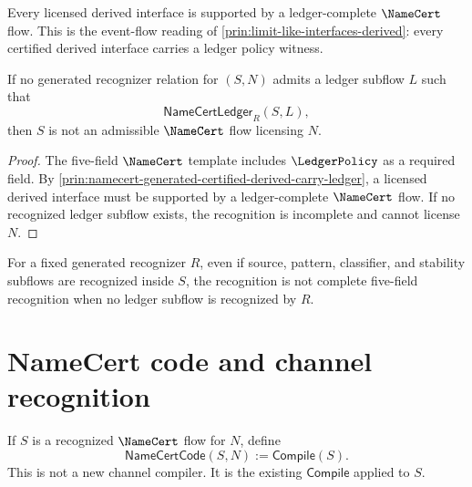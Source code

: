\begin{principle}
\label{prin:namecert-generated-certified-derived-carry-ledger}
Every licensed derived interface is supported by a ledger-complete $\NameCert$ flow. This is the event-flow reading of \autoref{prin:limit-like-interfaces-derived}: every certified derived interface carries a ledger policy witness.
\end{principle}

\begin{theorem}
\label{thm:namecert-generated-without-ledger-not-admissible}
If no generated recognizer relation for $(S,N)$ admits a ledger subflow $L$ such that
$$
  \mathsf{NameCertLedger}_{R}(S,L),
$$
then $S$ is not an admissible $\NameCert$ flow licensing $N$.
\end{theorem}

\begin{proof}
The five-field $\NameCert$ template includes $\LedgerPolicy$ as a required field. By \autoref{prin:namecert-generated-certified-derived-carry-ledger}, a licensed derived interface must be supported by a ledger-complete $\NameCert$ flow. If no recognized ledger subflow exists, the recognition is incomplete and cannot license $N$.
\end{proof}

\begin{corollary}
\label{cor:namecert-generated-four-fields-without-ledger-not-enough}
For a fixed generated recognizer $R$, even if source, pattern, classifier, and stability subflows are recognized inside $S$, the recognition is not complete five-field recognition when no ledger subflow is recognized by $R$.
\end{corollary}

\section{NameCert code and channel recognition}
\label{sec:namecert-generated-code-and-channel}

\begin{definition}
\label{def:namecert-generated-code}
If $S$ is a recognized $\NameCert$ flow for $N$, define
$$
  \mathsf{NameCertCode}(S,N) := \mathsf{Compile}(S).
$$
This is not a new channel compiler. It is the existing $\mathsf{Compile}$ applied to $S$.
\end{definition}

